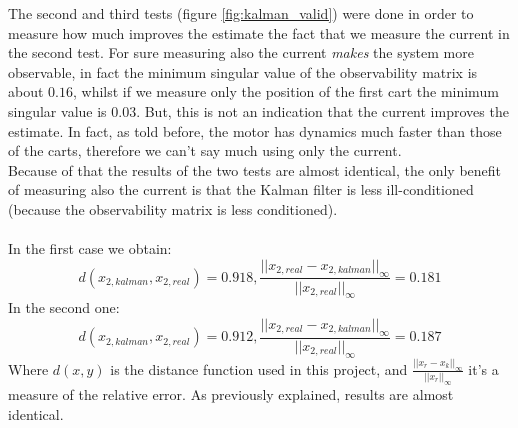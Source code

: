 The second and third tests (figure \ref{fig:kalman_valid}) were done in order to measure how much improves the estimate the fact that we measure the current in the second test. For sure measuring also the current \emph{makes} the system more observable, in fact the minimum singular value of the observability matrix is about $0.16$, whilst if we measure only the position of the first cart the minimum singular value is $0.03$. But, this is not an indication that the current improves the estimate. In fact, as told before, the motor  has dynamics much faster than those of the carts, therefore we can't say much using only the current.\\Because of that the results of the two tests are almost identical, the only benefit of measuring also the current is that the Kalman filter is less ill-conditioned (because the observability matrix is less conditioned).\\ \\
In the first case we obtain:
$$d(x_{2,kalman},x_{2,real}) = 0.918, \frac{||x_{2,real}-x_{2,kalman}||_{\infty}}{||x_{2,real}||_{\infty}}=0.181$$
In the second one:
$$d(x_{2,kalman},x_{2,real}) = 0.912, \frac{||x_{2,real}-x_{2,kalman}||_{\infty}}{||x_{2,real}||_{\infty}}=0.187$$
Where $d(x,y)$ is the distance function used in this project, and $\frac{||x_{r}-x_{k}||_{\infty}}{||x_{r}||_{\infty}}$ it's a measure of the relative error. As previously explained, results are almost identical.
